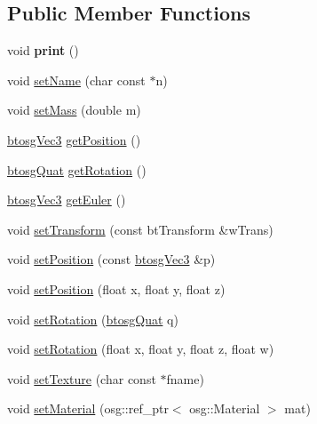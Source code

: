 \subsection*{Public Member Functions}
\begin{DoxyCompactItemize}
\item 
\mbox{\label{classbtosgObject_a4432b5c28097065e89e045a8d02c45e6}} 
void {\bfseries print} ()
\item 
void \mbox{\hyperlink{classbtosgObject_ab06a1b3f357209214c6440cd5746523e}{set\+Name}} (char const $\ast$n)
\item 
void \mbox{\hyperlink{classbtosgObject_a91da93c82d48b86192f0cbb16054fe57}{set\+Mass}} (double m)
\item 
\mbox{\hyperlink{classbtosgVec3}{btosg\+Vec3}} \mbox{\hyperlink{classbtosgObject_a3dadd5da8f2a312e44a039446b93d4cd}{get\+Position}} ()
\item 
\mbox{\hyperlink{classbtosgQuat}{btosg\+Quat}} \mbox{\hyperlink{classbtosgObject_a3b825999ad3a51bde743d4085ff19dae}{get\+Rotation}} ()
\item 
\mbox{\hyperlink{classbtosgVec3}{btosg\+Vec3}} \mbox{\hyperlink{classbtosgObject_a2019ec63bde02b72600450c7c985e77a}{get\+Euler}} ()
\item 
void \mbox{\hyperlink{classbtosgObject_ad33fcab26c0c83ccab6dca6906e8cdb0}{set\+Transform}} (const bt\+Transform \&w\+Trans)
\item 
void \mbox{\hyperlink{classbtosgObject_ace6b51040b7ddce90818174200cc6074}{set\+Position}} (const \mbox{\hyperlink{classbtosgVec3}{btosg\+Vec3}} \&p)
\item 
void \mbox{\hyperlink{classbtosgObject_adb9f2cff0faf66dc252cd7c97b11ac84}{set\+Position}} (float x, float y, float z)
\item 
void \mbox{\hyperlink{classbtosgObject_a6365748d5506bb9da31907c9988071fa}{set\+Rotation}} (\mbox{\hyperlink{classbtosgQuat}{btosg\+Quat}} q)
\item 
void \mbox{\hyperlink{classbtosgObject_a4d21ca59b944fd26644db35d3e9ba67a}{set\+Rotation}} (float x, float y, float z, float w)
\item 
void \mbox{\hyperlink{classbtosgObject_aff54acbc7c66811efb0cf2838107a241}{set\+Texture}} (char const $\ast$fname)
\item 
void \mbox{\hyperlink{classbtosgObject_a6ab7b9e0553dab398b980637788b56a8}{set\+Material}} (osg\+::ref\+\_\+ptr$<$ osg\+::\+Material $>$ mat)
\item 

\end{DoxyCompactItemize}

